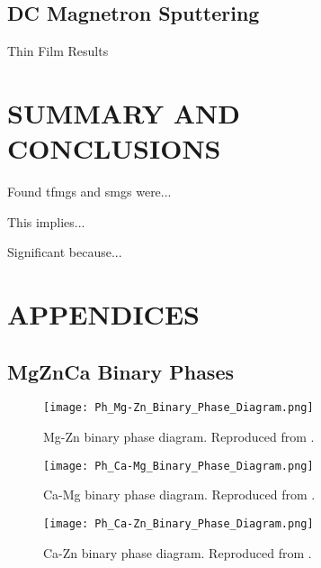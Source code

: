 \documentclass[a4paper,12pt,oneside]{report}%
\begin{document}
\section{DC Magnetron Sputtering}
Thin Film Results


\chapter{SUMMARY AND CONCLUSIONS}
\glsresetall

Found \glspl{tfmg} and \glspl{smg} were...

This implies...

Significant because...







\chapter{APPENDICES}

\section{MgZnCa Binary Phases}

\begin{figure}[h]
	\centering
	\texttt{[image: Ph\_Mg-Zn\_Binary\_Phase\_Diagram.png]}
	\caption[Mg-Zn binary phase diagram.]{Mg-Zn binary phase diagram. Reproduced from \cite{Predel1997}.}
	\label{fig:MgZnDiagram}
\end{figure}

\begin{figure}[h]
	\centering
	\texttt{[image: Ph\_Ca-Mg\_Binary\_Phase\_Diagram.png]}
	\caption[Ca-Mg binary phase diagram.]{Ca-Mg binary phase diagram. Reproduced from \cite{Nayeb1987}.}
	\label{fig:CaMgDiagram}
\end{figure}

\begin{figure}[h]
	\centering
	\texttt{[image: Ph\_Ca-Zn\_Binary\_Phase\_Diagram.png]}
	\caption[Ca-Zn binary phase diagram.]{Ca-Zn binary phase diagram. Reproduced from \cite{Messing1963}.}
	\label{fig:CaZnDiagram}
\end{figure}
\end{document}
